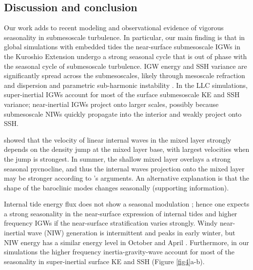 \documentclass[grl]{agutex2015}
\begin{document}
\begin{article}
\section{Discussion and conclusion}
Our work adds to recent modeling \citep[e.g., ][]{sasaki_etal2014}
and observational \citep[e.g., ][]{callies_etal2015,buckingham_etal2016} evidence of vigorous seasonality in
submesoscale turbulence. In particular, our main finding is that in global simulations with embedded tides the
near-surface submesoscale IGWs in the Kuroshio Extension undergo
a strong seasonal cycle that is out of phase with the seasonal cycle of
submesoscale turbulence. IGW energy and SSH variance are significantly spread across
the submesoscales, likely through mesoscale refraction and dispersion \citep[e.g.,][and references therein]{ponte_klein2015,alford_etal2016}
 and parametric
sub-harmonic instability \citep[e.g., ][]{mackinnon_winters2005}.
In the LLC simulations,
super-inertial IGWs account for most of the surface submesoscale KE and SSH variance;
near-inertial IGWs project onto larger scales, possibly because submesoscale
NIWs quickly propagate into the interior and weakly project onto SSH.


\cite{dasaro1978} showed that the velocity of linear internal waves
in the mixed layer strongly depends on the density jump at the mixed layer
base, with largest velocities when the jump is strongest.
In summer, the shallow mixed layer overlays a strong seasonal pycnocline,
and thus the internal waves projection onto the mixed layer may be stronger
according to \cite{dasaro1978}'s arguments. An
alternative explanation is that the shape of the baroclinic modes
changes seasonally (supporting information).

Internal tide energy flux does not show a seasonal modulation \citep[e.g.,][]{alford2003};
hence one expects a strong seasonality in the near-surface
expression of internal tides and
higher frequency IGWs if the near-surface stratification varies strongly.
Windy near-inertial wave (NIW) generation is intermittent and peaks in early winter, but
NIW energy has a similar energy level in October and April
\citep{alford_etal2016}. Furthermore, in our simulations the higher frequency inertia-gravity-wave
account for most of the seasonality in super-inertial surface KE and SSH
(Figure \ref{fig4}a-b).


\end{article}
\end{document}
